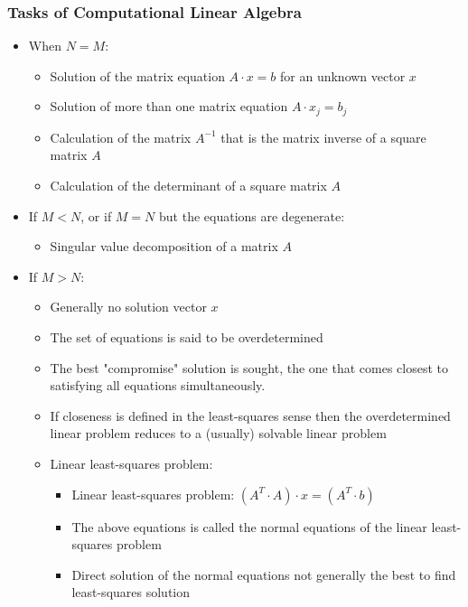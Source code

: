 \documentclass[a4wide,10pt]{article}
\begin{document}
\subsubsection{Tasks of Computational Linear Algebra} %
\label{ssub:tasks_of_computational_linear_algebra}
\begin{itemize}
	\item When $N = M$:
	\begin{itemize}
		\item Solution of the matrix equation $A \cdot x = b$ for an unknown vector $x$
		\item Solution of more than one matrix equation $A \cdot x_j = b_j$
		\item Calculation of the matrix $A^{-1}$ that is the matrix inverse of a square matrix $A$
		\item Calculation of the determinant of a square matrix $A$
	\end{itemize}
	\item If $M < N$, or if $M = N$ but the equations are degenerate:
	\begin{itemize}
		\item Singular value decomposition of a matrix $A$
	\end{itemize}
	\item If $M > N$:
	\begin{itemize}
		\item Generally no solution vector $x$
		\item The set of equations is said to be overdetermined
		\item The best "compromise" solution is sought, the one that comes closest to satisfying all equations simultaneously.
		\item If closeness is defined in the least-squares sense then the overdetermined linear problem reduces to a (usually) solvable linear problem
		\item Linear least-squares problem:
		\begin{itemize}
			\item Linear least-squares problem: $(A^T \cdot A) \cdot x = (A^T \cdot b)$
			\item The above equations is called the normal equations of the linear least-squares problem
			\item Direct solution of the normal equations not generally the best to find least-squares solution
		\end{itemize}
	\end{itemize}
\end{itemize}
\end{document}

